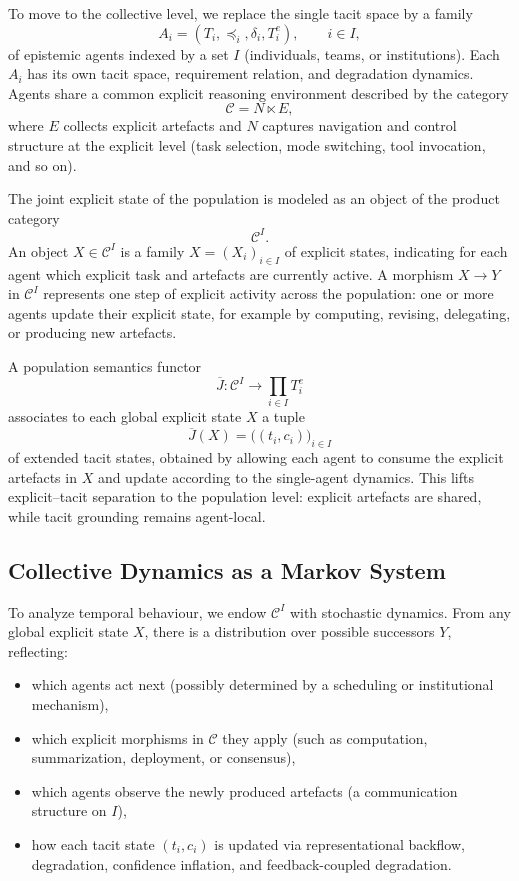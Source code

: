 To move to the collective level, we replace the single tacit space by a family
\[
  A_i = (T_i, \preceq_i, \delta_i, T^e_i),
  \qquad i \in I,
\]
of epistemic agents indexed by a set $I$ (individuals, teams, or institutions). Each $A_i$ has its own tacit space, requirement relation, and degradation dynamics. Agents share a common explicit reasoning environment described by the category
\[
  \mathcal{C} = N \ltimes E,
\]
where $E$ collects explicit artefacts and $N$ captures navigation and control structure at the explicit level (task selection, mode switching, tool invocation, and so on).

The joint explicit state of the population is modeled as an object of the product category
\[
  \mathcal{C}^I.
\]
An object $X \in \mathcal{C}^I$ is a family $X = (X_i)_{i\in I}$ of explicit states, indicating for each agent which explicit task and artefacts are currently active. A morphism $X \to Y$ in $\mathcal{C}^I$ represents one step of explicit activity across the population: one or more agents update their explicit state, for example by computing, revising, delegating, or producing new artefacts.

A population semantics functor
\[
  \overline{J} : \mathcal{C}^I \longrightarrow \prod_{i\in I} T^e_i
\]
associates to each global explicit state $X$ a tuple
\[
  \overline{J}(X) = \bigl((t_i,c_i)\bigr)_{i\in I}
\]
of extended tacit states, obtained by allowing each agent to consume the explicit artefacts in $X$ and update according to the single-agent dynamics. This lifts explicit--tacit separation to the population level: explicit artefacts are shared, while tacit grounding remains agent-local.

\subsection{Collective Dynamics as a Markov System}

To analyze temporal behaviour, we endow $\mathcal{C}^I$ with stochastic dynamics. From any global explicit state $X$, there is a distribution over possible successors $Y$, reflecting:
\begin{itemize}
  \item which agents act next (possibly determined by a scheduling or institutional mechanism),
  \item which explicit morphisms in $\mathcal{C}$ they apply (such as computation, summarization, deployment, or consensus),
  \item which agents observe the newly produced artefacts (a communication structure on $I$),
  \item how each tacit state $(t_i,c_i)$ is updated via representational backflow, degradation, confidence inflation, and feedback-coupled degradation.
\end{itemize}

